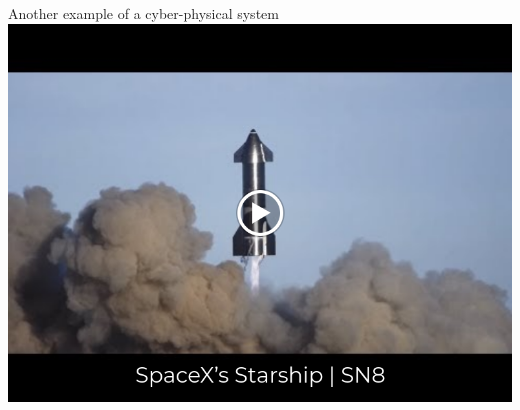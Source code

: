 \documentclass[aspectratio=169]{beamer}
\begin{document}
\begin{frame}{Another example of a cyber-physical system}
  \centering
  \href{https://www.youtube.com/watch?v=_qwLHlVjRyw&t=82s}{
    \includegraphics[scale=0.3]{Images/shuttle.png}
  }
\end{frame}
\end{document}
